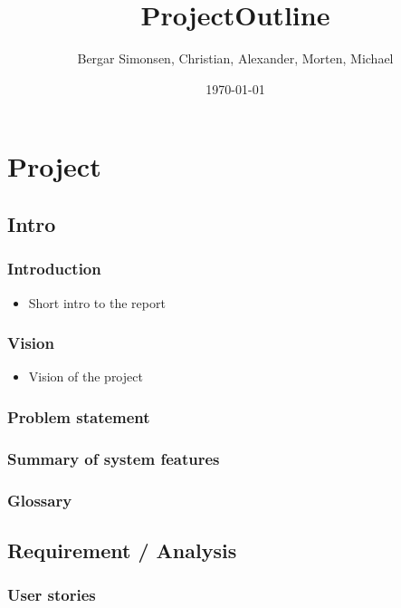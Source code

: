 \documentclass[11pt]{article}
\title{ProjectOutline}
\author{Bergar Simonsen, Christian, Alexander, Morten, Michael}
\date{\today}
\begin{document}
\maketitle

\setcounter{tocdepth}{3}
\tableofcontents
\vspace*{1cm}

\section{Project}

\subsection{Intro}

\subsubsection{Introduction}
\begin{itemize}
\item Short intro to the report
\end{itemize}

\subsubsection{Vision}
\begin{itemize}
\item Vision of the project
\end{itemize}

\subsubsection{Problem statement}

\subsubsection{Summary of system features}

\subsubsection{Glossary}

\subsection{Requirement / Analysis}

\subsubsection{User stories}
\end{document}
